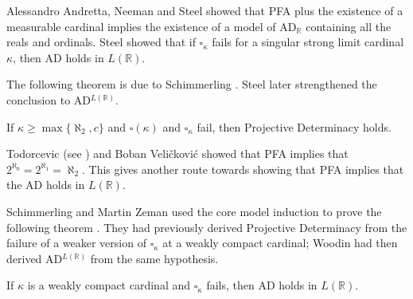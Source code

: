 \documentclass{book}%
\begin{document}
Alessandro Andretta, Neeman and Steel 
showed that PFA plus the existence of a
measurable cardinal implies the existence of a model of
AD$_{\mathbb{R}}$ containing all the reals and ordinals.
Steel  showed that if $\square_{\kappa}$ fails for
a singular strong limit cardinal $\kappa$, then AD holds in
$L(\mathbb{R})$.


The following theorem is due to Schimmerling .
Steel later strengthened the conclusion to AD$^{L(\mathbb{R})}$.

\begin{theorem} If $\kappa \geq \max\{\aleph_{2}, c\}$ and\/
$\square(\kappa)$ and\/ $\square_{\kappa}$ fail, then Projective Determinacy holds.
\end{theorem}

Todorcevic (see \cite{Bekkali}) and Boban Veli\v{c}kovi\'{c}  showed
that PFA implies that $2^{\aleph_{0}} = 2^{\aleph_{1}} = \aleph_{2}$. This gives another route towards showing that PFA implies that the AD holds in $L(\mathbb{R})$.



Schimmerling and Martin Zeman used the core model induction to prove
the following theorem . They had previously derived Projective Determinacy from
the failure of a weaker version of $\square_{\kappa}$ at a weakly compact cardinal; Woodin had then derived AD$^{L(\mathbb{R})}$ from
the same hypothesis.

\begin{theorem} If $\kappa$ is a weakly compact cardinal and\/
$\square_{\kappa}$ fails, then {\rm AD} holds in
$L(\mathbb{R})$.
\end{theorem}


\end{document}
